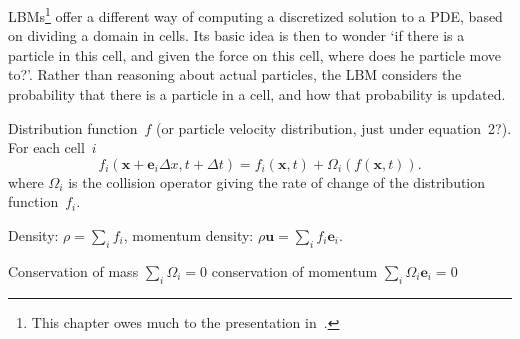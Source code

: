 \acfp{LBM}\footnote{This chapter owes much to the presentation
  in~\cite{ChenDoolen:LBM}.}  offer a different way of computing a
discretized solution to a \ac{PDE}, based on dividing a domain in
cells. Its basic idea is then to wonder `if there is a particle in
this cell, and given the force on this cell, where does he particle
move to?'. Rather than reasoning about actual particles, the \ac{LBM}
considers the probability that there is a particle in a cell, and how
that probability is updated.

Distribution function~$f$ (or particle velocity distribution, just
under equation~2?).  For each cell~$i$
\[ f_i(\mathbf{x}+\mathbf{e}_i\Delta x,t+\Delta t) 
    = f_i(\mathbf{x},t)+\Omega_i(f(\mathbf{x},t)).
\]
where $\Omega_i$ is the collision operator giving
the rate of change of the distribution function~$f_i$.

Density: $\rho=\sum_i f_i$,
momentum density: $\rho\mathbf{u}=\sum_if_i\mathbf{e}_i$.

Conservation of mass $\sum_i\Omega_i=0$
conservation of momentum $\sum_i\Omega_i\mathbf{e}_i=0$


